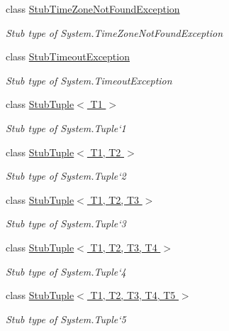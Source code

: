 \begin{DoxyCompactItemize}
class \hyperlink{class_system_1_1_fakes_1_1_stub_time_zone_not_found_exception}{Stub\-Time\-Zone\-Not\-Found\-Exception}
\begin{DoxyCompactList}\small\item\em Stub type of System.\-Time\-Zone\-Not\-Found\-Exception\end{DoxyCompactList}\item 
class \hyperlink{class_system_1_1_fakes_1_1_stub_timeout_exception}{Stub\-Timeout\-Exception}
\begin{DoxyCompactList}\small\item\em Stub type of System.\-Timeout\-Exception\end{DoxyCompactList}\item 
class \hyperlink{class_system_1_1_fakes_1_1_stub_tuple_3_01_t1_01_4}{Stub\-Tuple$<$ T1 $>$}
\begin{DoxyCompactList}\small\item\em Stub type of System.\-Tuple`1\end{DoxyCompactList}\item 
class \hyperlink{class_system_1_1_fakes_1_1_stub_tuple_3_01_t1_00_01_t2_01_4}{Stub\-Tuple$<$ T1, T2 $>$}
\begin{DoxyCompactList}\small\item\em Stub type of System.\-Tuple`2\end{DoxyCompactList}\item 
class \hyperlink{class_system_1_1_fakes_1_1_stub_tuple_3_01_t1_00_01_t2_00_01_t3_01_4}{Stub\-Tuple$<$ T1, T2, T3 $>$}
\begin{DoxyCompactList}\small\item\em Stub type of System.\-Tuple`3\end{DoxyCompactList}\item 
class \hyperlink{class_system_1_1_fakes_1_1_stub_tuple_3_01_t1_00_01_t2_00_01_t3_00_01_t4_01_4}{Stub\-Tuple$<$ T1, T2, T3, T4 $>$}
\begin{DoxyCompactList}\small\item\em Stub type of System.\-Tuple`4\end{DoxyCompactList}\item 
class \hyperlink{class_system_1_1_fakes_1_1_stub_tuple_3_01_t1_00_01_t2_00_01_t3_00_01_t4_00_01_t5_01_4}{Stub\-Tuple$<$ T1, T2, T3, T4, T5 $>$}
\begin{DoxyCompactList}\small\item\em Stub type of System.\-Tuple`5\end{DoxyCompactList}\item 

\end{DoxyCompactItemize}
